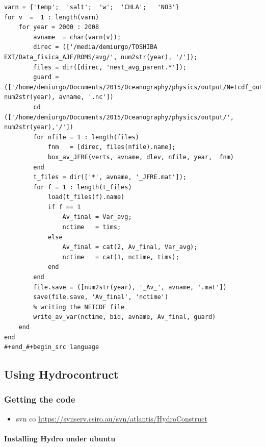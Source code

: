 \documentclass[11pt]{article}
\begin{document}
\begin{itemize}
\begin{itemize}
\begin{verbatim}
varn = {'temp';  'salt';  'w';  'CHLA';   'NO3'}
for v  =  1 : length(varn)
    for year = 2000 : 2008
        avname  = char(varn(v));
        direc = (['/media/demiurgo/TOSHIBA EXT/Data_fisica_AJF/ROMS/avg/', num2str(year), '/']);
        files = dir([direc, 'nest_avg_parent.*']);
        guard = (['/home/demiurgo/Documents/2015/Oceanography/physics/output/Netcdf_out/JFRE_', num2str(year), avname, '.nc'])
        cd (['/home/demiurgo/Documents/2015/Oceanography/physics/output/', num2str(year),'/'])
        for nfile = 1 : length(files)
            fnm   = [direc, files(nfile).name];
            box_av_JFRE(verts, avname, dlev, nfile, year,  fnm)
        end
        t_files = dir(['*', avname, '_JFRE.mat']);
        for f = 1 : length(t_files)
            load(t_files(f).name)
            if f == 1
                Av_final = Var_avg;
                nctime   = tims;
            else
                Av_final = cat(2, Av_final, Var_avg);
                nctime   = cat(1, nctime, tims);
            end
        end
        file.save = ([num2str(year), '_Av_', avname, '.mat'])
        save(file.save, 'Av_final', 'nctime')
        % writing the NETCDF file
        write_av_var(nctime, bid, avname, Av_final, guard)
    end
end
#+end_#+begin_src language
\end{verbatim}

\end{itemize} %
\end{itemize} %
\subsection*{Using Hydrocontruct}
\label{sec-4-4}
\subsubsection*{Getting the code}
\label{sec-4-4-1}

\begin{itemize}
\item svn co \href{https://svnserv.csiro.au/svn/atlantis/HydroConstruct}{https://svnserv.csiro.au/svn/atlantis/HydroConstruct}
\end{itemize}
\paragraph*{Installing Hydro under ubuntu}
\label{sec-4-4-1-1}
\end{document}
